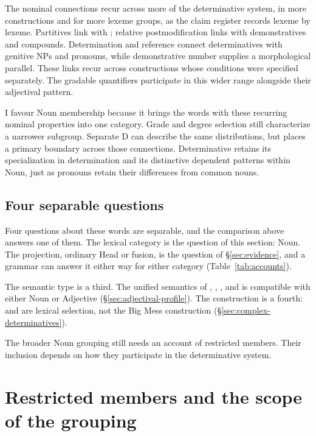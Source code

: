 \documentclass[12pt]{article}
\begin{document}
The nominal connections recur across more of the determinative system, in more constructions and for more lexeme groups, as the claim register records lexeme by lexeme. Partitives link  with ; relative postmodification links  with demonstratives and compounds. Determination and reference connect determinatives with genitive NPs and pronouns, while demonstrative number supplies a morphological parallel. These links recur across constructions whose conditions were specified separately. The gradable quantifiers participate in this wider range alongside their adjectival pattern.

I favour Noun membership because it brings the words with these recurring nominal properties into one category. Grade and degree selection still characterize a narrower subgroup. Separate D can describe the same distributions, but places a primary boundary across those connections. Determinative retains its specialization in determination and its distinctive dependent patterns within Noun, just as pronouns retain their differences from common nouns.

\subsection{Four separable questions}\label{sec:four-questions}

Four questions about these words are separable, and the comparison above answers one of them. The lexical category is the question of this section: Noun. The projection, ordinary Head or fusion, is the question of §\ref{sec:evidence}, and a grammar can answer it either way for either category (Table~\ref{tab:accounts}).

The semantic type is a third. The unified semantics of , , , and  is compatible with either Noun or Adjective (§\ref{sec:adjectival-profile}). The construction is a fourth:  and  are lexical selection, not the Big Mess construction (§\ref{sec:complex-determinatives}).

The broader Noun grouping still needs an account of restricted members. Their inclusion depends on how they participate in the determinative system.

\section{Restricted members and the scope of the grouping}\label{sec:articles}
\end{document}
